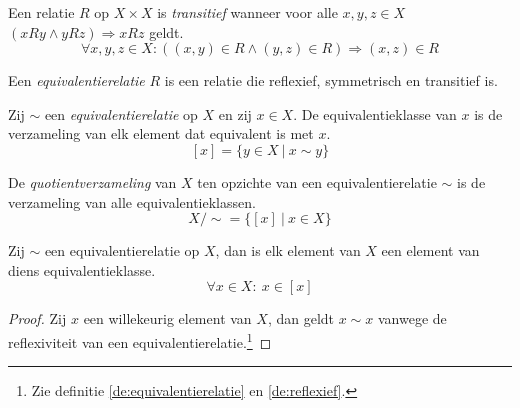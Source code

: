 \documentclass[main.tex]{subfiles}
\begin{document}
\begin{de}
  \label{de:transitief}
  Een relatie $R$ op $X \times X$ is \emph{transitief} wanneer voor alle $x,y,z\in X$ $(xRy \wedge yRz) \Rightarrow xRz$ geldt.
  \[ \forall x,y,z \in X: ((x,y) \in R \wedge (y,z) \in R) \Rightarrow (x,z) \in R\]
\end{de}

\begin{de}
  \label{de:equivalentierelatie}
  Een \emph{equivalentierelatie} $R$ is een relatie die reflexief, symmetrisch en transitief is.
\end{de}

\begin{de}
  Zij $\sim$ een \emph{equivalentierelatie} op $X$ en zij $x \in X$.
  De equivalentieklasse van $x$ is de verzameling van elk element dat equivalent is met $x$.
  \[ [x] = \{ y \in X\ |\ x \sim y \} \]
\end{de}

\begin{de}
  De \emph{quotientverzameling} van $X$ ten opzichte van een equivalentierelatie $\sim$ is de verzameling van alle equivalentieklassen.
  \[ X/\sim = \{[x] \ |\ x \in X \}\]
\end{de}

\begin{st}
  \label{st:element-in-equivalentieklasse}
  Zij $\sim$ een equivalentierelatie op $X$, dan is elk element van $X$ een element van diens equivalentieklasse.
  \[ \forall x \in X:\ x \in [x] \]
  
  \begin{proof}
    Zij $x$ een willekeurig element van $X$, dan geldt $x \sim x$ vanwege de reflexiviteit van een equivalentierelatie.\footnote{Zie definitie \ref{de:equivalentierelatie} en \ref{de:reflexief}.}
  \end{proof}
\end{st}
\end{document}
